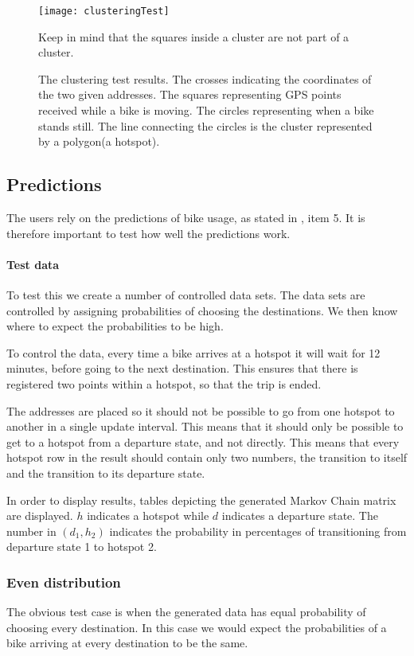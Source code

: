 \begin{figure}
\texttt{[image: clusteringTest]}
\caption{The clustering test results. 
The crosses indicating the coordinates of the two given addresses. The squares representing GPS points received while a bike is moving. The circles representing when a bike stands still. The line connecting the circles is the cluster represented by a polygon(a hotspot).}
 Keep in mind that the squares inside a cluster are not part of a cluster.
\label{fig:test:clustering}
\end{figure}

\subsection{Predictions}
The users rely on the predictions of bike usage, as stated in , item 5.
It is therefore important to test how well the predictions work.

\paragraph{Test data} To test this we create a number of controlled data sets.
The data sets are controlled by assigning probabilities of choosing the destinations. 
We then know where to expect the probabilities to be high.

To control the data, every time a bike arrives at a hotspot it will wait for 12 minutes, before going to the next destination.
This ensures that there is registered two points within a hotspot, so that the trip is ended.

The addresses are placed so it should not be possible to go from one hotspot to another in a single update interval.
This means that it should only be possible to get to a hotspot from a departure state, and not directly.
This means that every hotspot row in the result should contain only two numbers, the transition to itself and the transition to its departure state.

In order to display results, tables depicting the generated Markov Chain matrix are displayed.
$h$ indicates a hotspot while $d$ indicates a departure state.
The number in $ (d_1,h_2) $ indicates the probability in percentages of transitioning from departure state 1 to hotspot 2. 

\subsubsection{Even distribution}
The obvious test case is when the generated data has equal probability of choosing every destination. 
In this case we would expect the probabilities of a bike arriving at every destination to be the same.

